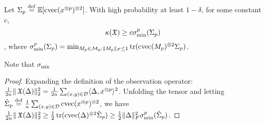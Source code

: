 \begin{lemma}
Let $\Sigma_p \stackrel{\rm def}{=} \operatorname{\mathbb{E}}[\operatorname{cvec}(x^{\otimes p})^{\otimes 2}]$.
With high probability at least $1-\delta$,
for some constant $c$,
$$\kappa(\operatorname{\mathfrak{X}}) \ge c \sigma_\text{min}^p(\Sigma_p)$$,
where
$\sigma_\text{min}^p(\Sigma_p) = \min_{M_p \in \mathcal{M}_p : \|M_p\|_F \le 1} \operatorname{tr}(\operatorname{cvec}(M_p)^{\otimes 2} \Sigma_p)$.
\end{lemma}
Note that $\sigma_\text{min}$ 
\begin{proof}
Expanding the definition of the observation operator:
$\frac{1}{2n} \|\operatorname{\mathfrak{X}}(\Delta)\|_2^2
= \frac{1}{2n} \sum_{(x,y) \in \mathcal{D}} \langle \Delta, x^{\otimes p} \rangle^2$.
Unfolding the tensor and letting $\hat\Sigma_p \stackrel{\rm def}{=} \frac{1}{n} \sum_{(x,y) \in \mathcal{D}} \operatorname{cvec}(x^{\otimes p})^{\otimes 2}$,
we have 
$\frac{1}{2n} \|\operatorname{\mathfrak{X}}(\Delta)\|_2^2
\ge \frac{1}{2} \operatorname{tr}(\operatorname{cvec}(\Delta)^{\otimes 2} \hat\Sigma_p)
\ge \frac{1}{2} \|\Delta\|_F^2 \sigma_\text{min}^p(\hat\Sigma_p)$.

%
%  
%  
\end{proof}

